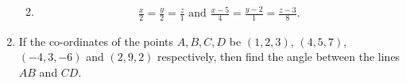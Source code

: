 \begin{enumerate}[label=\thesubsection.\arabic*, ref=\thesubsection.\theenumi]
\begin{enumerate}
\begin{align}
\end{align}
\item
\begin{align} \frac{x}{2}=\frac{y}{2}=\frac{z}{1}\text{ and } \frac{x-5}{4}=\frac{y-2}{1}=\frac{z-3}{8}.
\end{align}
\end{enumerate}
\item If the co-ordinates of the points $A, B, C, D$ be $(1, 2, 3)$,  $(4, 5, 7)$,  $(-4, 3, -6)$ and $(2, 9, 2)$ respectively,  then find the angle between the lines $AB$ and $CD$.
\end{enumerate}
